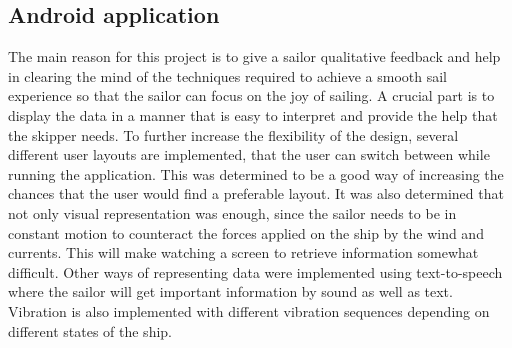 \subsection{Android application}
The main reason for this project is to give a sailor qualitative feedback and help in clearing the mind of the techniques required to achieve a smooth sail experience so that the sailor can focus on the joy of sailing. A crucial part is to display the data in a manner that is easy to interpret and provide the help that the skipper needs. To further increase the flexibility of the design, several different user layouts are implemented, that the user can switch between while running the application. This was determined to be a good way of increasing the chances that the user would find a preferable layout. It was also determined that not only visual representation was enough, since the sailor needs to be in constant motion to counteract the forces applied on the ship by the wind and currents. This will make watching a screen to retrieve information somewhat difficult. Other ways of representing data were implemented using text-to-speech where the sailor will get important information by sound as well as text. Vibration is also implemented with different vibration sequences depending on different states of the ship.


